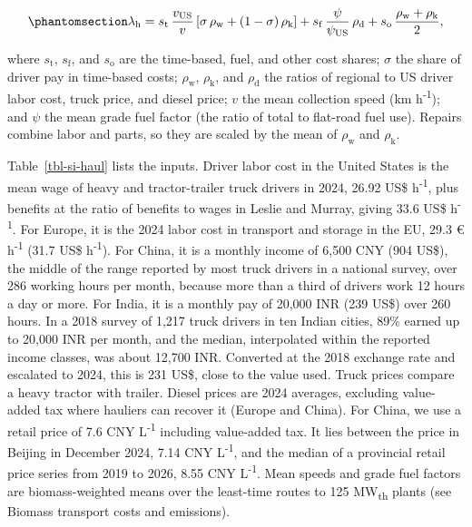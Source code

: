 \documentclass[
  letterpaper,
  twoside,
  twocolumn,
  9pt]{article}
\begin{document}
\begin{equation}\phantomsection\label{eq-haul-factor}{\lambda_{\mathrm{h}} = s_{\mathrm{t}}\, \frac{v_{\mathrm{US}}}{v} \left[ \sigma\, \rho_{\mathrm{w}} + (1 - \sigma)\, \rho_{\mathrm{k}} \right] + s_{\mathrm{f}}\, \frac{\psi}{\psi_{\mathrm{US}}}\, \rho_{\mathrm{d}} + s_{\mathrm{o}}\, \frac{\rho_{\mathrm{w}} + \rho_{\mathrm{k}}}{2},}\end{equation}

where \(s_{\mathrm{t}}\), \(s_{\mathrm{f}}\), and \(s_{\mathrm{o}}\) are
the time-based, fuel, and other cost shares; \(\sigma\) the share of
driver pay in time-based costs; \(\rho_{\mathrm{w}}\),
\(\rho_{\mathrm{k}}\), and \(\rho_{\mathrm{d}}\) the ratios of regional
to US driver labor cost, truck price, and diesel price; \(v\) the mean
collection speed (km h\textsuperscript{-1}); and \(\psi\) the mean grade
fuel factor (the ratio of total to flat-road fuel use). Repairs combine
labor and parts, so they are scaled by the mean of \(\rho_{\mathrm{w}}\)
and \(\rho_{\mathrm{k}}\).

Table~\ref{tbl-si-haul} lists the inputs. Driver labor cost in the
United States is the mean wage of heavy and tractor-trailer truck
drivers in 2024, 26.92 US\$ h\textsuperscript{-1},\citep{bls2025oes}
plus benefits at the ratio of benefits to wages in Leslie and
Murray\citep{atri2024}, giving 33.6 US\$ h\textsuperscript{-1}. For
Europe, it is the 2024 labor cost in transport and storage in the EU,
29.3 € h\textsuperscript{-1} (31.7 US\$
h\textsuperscript{-1}).\citep{eurostat2025lc} For China, it is a monthly
income of 6,500 CNY (904 US\$), the middle of the range reported by most
truck drivers in a national survey,\citep{cflp2025} over 286 working
hours per month, because more than a third of drivers work 12 hours a
day or more. For India, it is a monthly pay of 20,000 INR (239 US\$)
over 260 hours. In a 2018 survey of 1,217 truck drivers in ten Indian
cities, 89\% earned up to 20,000 INR per month, and the median,
interpolated within the reported income classes, was about 12,700
INR.\citep{savelife2020} Converted at the 2018 exchange rate and
escalated to 2024, this is 231 US\$, close to the value used. Truck
prices compare a heavy tractor with trailer. Diesel prices are 2024
averages, excluding value-added tax where hauliers can recover it
(Europe and China).\citep{eia2026diesel, ec2024oilbulletin, bpcl2024hsd}
For China, we use a retail price of 7.6 CNY L\textsuperscript{-1}
including value-added tax. It lies between the price in Beijing in
December 2024, 7.14 CNY L\textsuperscript{-1},\citep{statista2024diesel}
and the median of a provincial retail price series from 2019 to 2026,
8.55 CNY L\textsuperscript{-1}.\citep{ceic2026diesel} Mean speeds and
grade fuel factors are biomass-weighted means over the least-time routes
to 125 MW\textsubscript{th} plants (see Biomass transport costs and
emissions).
\end{document}
